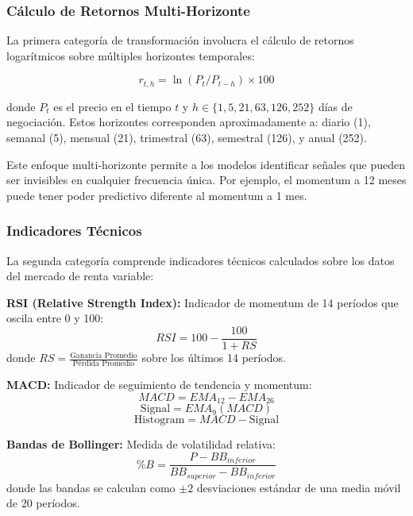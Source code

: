 \documentclass[11pt,a4paper]{article}
\begin{document}
\subsubsection{Cálculo de Retornos Multi-Horizonte}

La primera categoría de transformación involucra el cálculo de retornos logarítmicos sobre múltiples horizontes temporales:

\begin{equation}
r_{t,h} = \ln(P_t / P_{t-h}) \times 100
\end{equation}

donde $P_t$ es el precio en el tiempo $t$ y $h \in \{1, 5, 21, 63, 126, 252\}$ días de negociación. Estos horizontes corresponden aproximadamente a: diario (1), semanal (5), mensual (21), trimestral (63), semestral (126), y anual (252).

Este enfoque multi-horizonte permite a los modelos identificar señales que pueden ser invisibles en cualquier frecuencia única. Por ejemplo, el momentum a 12 meses puede tener poder predictivo diferente al momentum a 1 mes.

\subsubsection{Indicadores Técnicos}

La segunda categoría comprende indicadores técnicos calculados sobre los datos del mercado de renta variable:

\textbf{RSI (Relative Strength Index):} Indicador de momentum de 14 períodos que oscila entre 0 y 100:
\begin{equation}
RSI = 100 - \frac{100}{1 + RS}
\end{equation}
donde $RS = \frac{\text{Ganancia Promedio}}{\text{Pérdida Promedio}}$ sobre los últimos 14 períodos.

\textbf{MACD:} Indicador de seguimiento de tendencia y momentum:
\begin{equation}
MACD = EMA_{12} - EMA_{26}
\end{equation}
\begin{equation}
\text{Signal} = EMA_9(MACD)
\end{equation}
\begin{equation}
\text{Histogram} = MACD - \text{Signal}
\end{equation}

\textbf{Bandas de Bollinger:} Medida de volatilidad relativa:
\begin{equation}
\%B = \frac{P - BB_{inferior}}{BB_{superior} - BB_{inferior}}
\end{equation}
donde las bandas se calculan como $\pm 2$ desviaciones estándar de una media móvil de 20 períodos.
\end{document}
